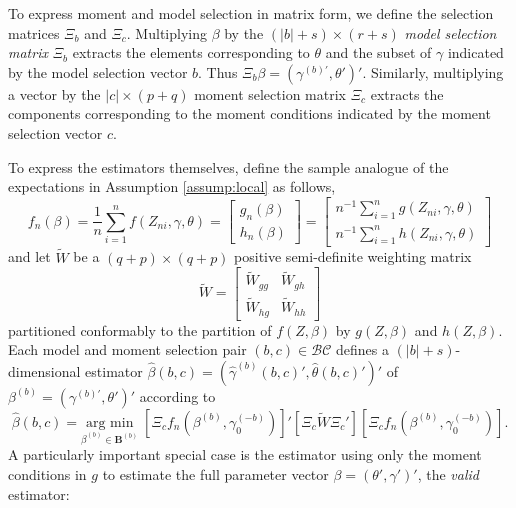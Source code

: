To express moment and model selection in matrix form, we define the selection matrices $\Xi_b$ and $\Xi_c$.
Multiplying $\beta$ by the $(|b| + s)\times(r+s)$ \emph{model selection matrix} $\Xi_b$ extracts the elements corresponding to $\theta$ and the subset of $\gamma$ indicated by the model selection vector $b$. 
Thus $\Xi_b \beta = \left(\gamma^{(b)'}, \theta' \right)'$.
Similarly, multiplying a vector by the $|c|\times(p+q)$ moment selection matrix $\Xi_c$ extracts the components corresponding to the moment conditions indicated by the moment selection vector $c$. 

To express the estimators themselves, define the sample analogue of the expectations in Assumption \ref{assump:local} as follows,
\begin{equation}
	f_n(\beta) = \frac{1}{n}\sum_{i=1}^n f(Z_{ni}, \gamma, \theta) = \left[\begin{array}{c}g_n(\beta)\\ h_n(\beta) \end{array} \right] = \left[\begin{array}{c} n^{-1}\sum_{i=1}^n g(Z_{ni}, \gamma, \theta)\\n^{-1}\sum_{i=1}^n h(Z_{ni}, \gamma, \theta) \end{array}\right]
\end{equation}
and let $\widetilde{W}$ be a $(q+p)\times(q+p)$ positive semi-definite weighting matrix
\begin{equation}
	\widetilde{W} = \left[\begin{array}{cc} \widetilde{W}_{gg} & \widetilde{W}_{gh}\\ \widetilde{W}_{hg} & \widetilde{W}_{hh}  \end{array}\right]
\end{equation}
partitioned conformably to the partition of $f(Z,\beta)$ by $g(Z,\beta)$ and $h(Z,\beta)$. Each model and moment selection pair $(b,c)\in \mathcal{BC}$ defines a $(|b|+s)$-dimensional estimator $\widehat{\beta}(b,c)=( \widehat{\gamma}^{(b)}(b,c)',\widehat{\theta}(b,c)')'$ of $\beta^{(b)}= \left(\gamma^{(b)'}, \theta'  \right)'$ according to
	\begin{equation}
    \widehat{\beta}(b,c) = \underset{\beta^{(b)}\in \mathbf{B}^{(b)}} {\mbox{arg min}}\;\left[\Xi_c f_n\left(\beta^{(b)}, \gamma_0^{(-b)}\right)\right]'\left[\Xi_c \widetilde{W}\Xi_c' \right]\left[\Xi_c f_n\left(\beta^{(b)}, \gamma_0^{(-b)}\right)\right].
	\end{equation}
A particularly important special case is the estimator using only the moment conditions in $g$ to estimate the full parameter vector $\beta = \left(\theta', \gamma' \right)'$, the \emph{valid} estimator:
